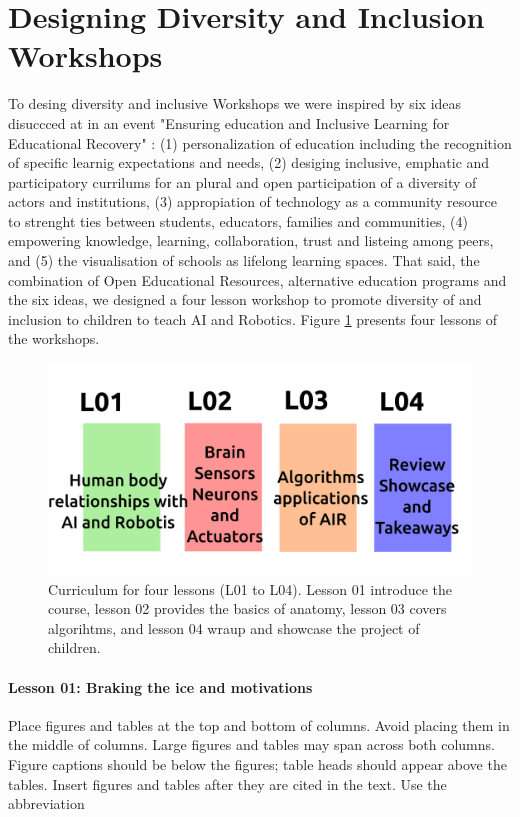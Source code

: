 \documentclass[conference]{IEEEtran}
\begin{document}
\section{Designing Diversity and Inclusion Workshops}
To desing diversity and inclusive Workshops we were inspired by six ideas disuccced at in an event "Ensuring education and Inclusive Learning for Educational Recovery" \cite{opertti2021-unesco}:
(1) personalization of education including the recognition of specific learnig expectations and needs,
(2) desiging inclusive, emphatic and participatory currilums for an plural and open participation of a diversity of actors and institutions,  
(3) appropiation of technology as a community resource to strenght ties between students, educators, families and communities,  
(4) empowering knowledge, learning, collaboration, trust and listeing among peers, and
(5) the visualisation of schools as lifelong learning spaces.
That said, the combination of Open Educational Resources, alternative education programs and the six ideas, we designed a four lesson workshop to promote diversity of and inclusion to children to teach AI and Robotics. 
Figure \ref{fig:curriculum} presents four lessons of the workshops.
\begin{figure}[htbp]
    \centerline{\includegraphics[width=\linewidth]{curriculum-design/versions/drawing-v00.png}}
    \caption{Curriculum for four lessons (L01 to L04). 
    Lesson 01 introduce the course, 
    lesson 02 provides the basics of anatomy, 
    lesson 03 covers algorihtms, and 
    lesson 04 wraup and showcase the project of children.
    }
    \label{fig:curriculum}
\end{figure}

\paragraph{Lesson 01: Braking the ice and motivations} 
Place figures and tables at the top and bottom of columns. Avoid placing them in the middle of columns. 
Large figures and tables may span across both columns. Figure captions should be below the figures; table heads should appear above the tables. 
Insert figures and tables after they are cited in the text. Use the abbreviation 
\end{document}
